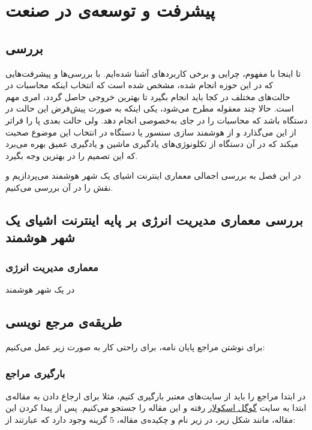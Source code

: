 \chapter{پیشرفت و توسعه‌ی  در صنعت}

\section{بررسی }
تا اینجا با مفهوم، چرایی و برخی کاربردهای  آشنا شده‌ایم.
با بررسی‌ها و پیشرفت‌هایی که در این حوزه انجام شده، مشخص شده است که انتخاب اینکه محاسبات در حالت‌های مختلف در کجا باید انجام بگیرد تا بهترین خروجی حاصل گردد، امری مهم است.
حالا چند معقوله مطرح می‌شود، یکی اینکه به صورت پیش‌فرض این حالت در دستگاه باشد که محاسبات را در جای به‌خصوصی انجام دهد.
ولی حالت بعدی پا را فراتر از این می‌گذارد و از هوشمند سازی سنسور یا دستگاه در انتخاب این موضوع صحبت میکند که در آن دستگاه از تکلونوژی‌های یادگیری ماشین و یادگیری عمیق بهره می‌برد که این تصمیم را در بهترین وجه بگیرد.

در این فصل به بررسی اجمالی معماری اینترنت اشیای یک شهر هوشمند می‌پردازیم و نقش  را در آن بررسی می‌کنیم.

\section{بررسی معماری مدیریت انرژی بر پایه اینترنت اشیای یک شهر هوشمند}
\subsection{معماری مدیریت انرژی}
در یک شهر هوشمند

\section{طریقه‌ی مرجع نویسی}
برای نوشتن مراجع پایان نامه، برای راحتی کار به صورت زیر عمل می‌کنیم:
\subsection{بارگیری مراجع}
در ابتدا مراجع را باید از سایت‌های معتبر بارگیری کنیم، مثلا برای ارجاع دادن به مقاله‌ی
ابتدا به سایت
\href{scholar.google.com}{گوگل اسکولار} 
رفته و این مقاله را جستجو می‌کنیم. پس از پیدا کردن این مقاله، مانند شکل زیر، در زیر نام و چکیده‌ی مقاله، $5$ گزینه وجود دارد که عبارتند از:\\

